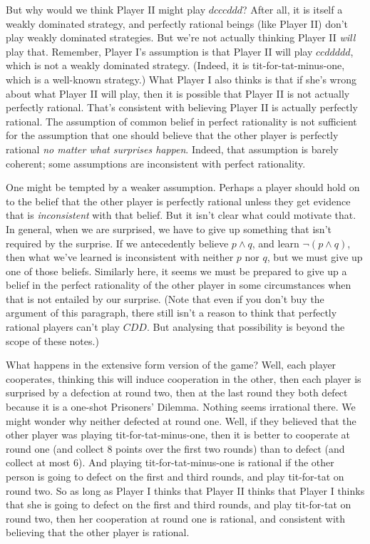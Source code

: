 \documentclass[
  11pt,
  letterpaper,
]{scrbook}
\begin{document}
But why would we think Player II might play \(dcccddd\)? After all, it
is itself a weakly dominated strategy, and perfectly rational beings
(like Player II) don't play weakly dominated strategies. But we're not
actually thinking Player II \emph{will} play that. Remember, Player I's
assumption is that Player II will play \(ccddddd\), which is not a
weakly dominated strategy. (Indeed, it is tit-for-tat-minus-one, which
is a well-known strategy.) What Player I also thinks is that if she's
wrong about what Player II will play, then it is possible that Player II
is not actually perfectly rational. That's consistent with believing
Player II is actually perfectly rational. The assumption of common
belief in perfect rationality is not sufficient for the assumption that
one should believe that the other player is perfectly rational \emph{no
matter what surprises happen}. Indeed, that assumption is barely
coherent; some assumptions are inconsistent with perfect rationality.

One might be tempted by a weaker assumption. Perhaps a player should
hold on to the belief that the other player is perfectly rational unless
they get evidence that is \emph{inconsistent} with that belief. But it
isn't clear what could motivate that. In general, when we are surprised,
we have to give up something that isn't required by the surprise. If we
antecedently believe \(p \wedge q\), and learn \(\neg (p \wedge q)\),
then what we've learned is inconsistent with neither \(p\) nor \(q\),
but we must give up one of those beliefs. Similarly here, it seems we
must be prepared to give up a belief in the perfect rationality of the
other player in some circumstances when that is not entailed by our
surprise. (Note that even if you don't buy the argument of this
paragraph, there still isn't a reason to think that perfectly rational
players can't play \(CDD\). But analysing that possibility is beyond the
scope of these notes.)

What happens in the extensive form version of the game? Well, each
player cooperates, thinking this will induce cooperation in the other,
then each player is surprised by a defection at round two, then at the
last round they both defect because it is a one-shot Prisoners' Dilemma.
Nothing seems irrational there. We might wonder why neither defected at
round one. Well, if they believed that the other player was playing
tit-for-tat-minus-one, then it is better to cooperate at round one (and
collect 8 points over the first two rounds) than to defect (and collect
at most 6). And playing tit-for-tat-minus-one is rational if the other
person is going to defect on the first and third rounds, and play
tit-for-tat on round two. So as long as Player I thinks that Player II
thinks that Player I thinks that she is going to defect on the first and
third rounds, and play tit-for-tat on round two, then her cooperation at
round one is rational, and consistent with believing that the other
player is rational.
\end{document}
